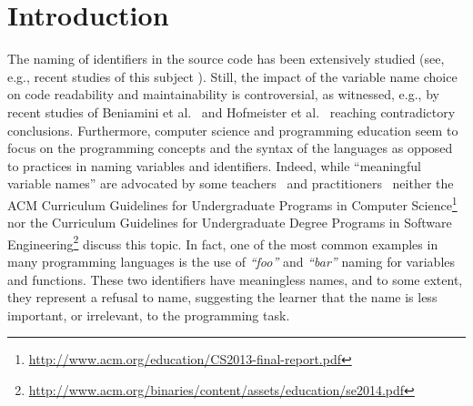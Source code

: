 \documentclass[conference]{IEEEtran}
\newcommand{\todo}[1]{ \textbf{#1} }
\newcommand{\quotes}[1]{\textit{``#1''}}
\begin{document}
\section{Introduction}
The naming of identifiers in the source code has been extensively studied (see, e.g., recent studies of this subject \cite{AmanASK15,AvidanF17,Beniamini,ButlerWYS10,HofmeisterSH17,LunguK13,ScannielloR13,TramontanaRS14}).
Still, the impact of the variable name choice on code readability and maintainability is controversial, as witnessed, e.g., by recent studies of Beniamini et al.~\cite{Beniamini} and Hofmeister et al.~\cite{HofmeisterSH17} reaching contradictory conclusions.
%
Furthermore, computer science and programming education seem to focus on the programming concepts and the syntax of the languages as opposed to practices in naming variables and identifiers. 
Indeed, while ``meaningful variable names'' are advocated by some teachers~\cite{Kato2016} and practitioners~\cite{Rother} neither the ACM Curriculum Guidelines for Undergraduate Programs in Computer Science\footnote{\url{http://www.acm.org/education/CS2013-final-report.pdf}} nor the Curriculum Guidelines for Undergraduate Degree Programs in Software Engineering\footnote{\url{http://www.acm.org/binaries/content/assets/education/se2014.pdf}} discuss this topic.
In fact, one of the most common examples in many programming languages is the use of \quotes{foo} and \quotes{bar} naming for variables and functions. 
These two identifiers have meaningless names, and to some extent, they represent a refusal to name, suggesting the learner that the name is less important, or irrelevant, to the programming task. 
\end{document}
